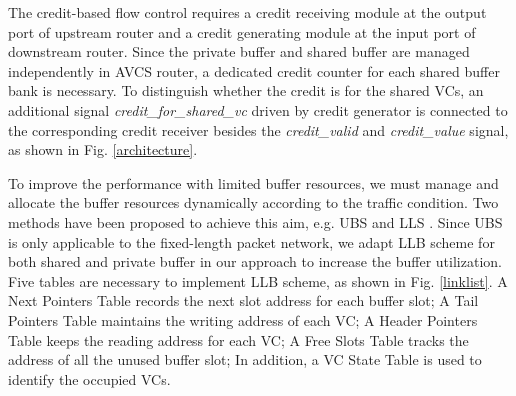 \documentclass[10pt,conference]{IEEEtran}
\begin{document}
The credit-based flow control requires a credit receiving module at the output port of upstream router and a credit generating module at the input port of downstream router. Since the private buffer and shared buffer are managed independently in AVCS router, a dedicated credit counter for each shared buffer bank is necessary. To distinguish whether the credit is for the shared VCs, an additional signal \emph{credit\_for\_shared\_vc} driven by credit generator is connected to the corresponding credit receiver besides the \emph{credit\_valid} and \emph{credit\_value} signal, as shown in Fig. \ref{architecture}.

To improve the performance with limited buffer resources, we must manage and allocate the buffer resources dynamically according to the traffic condition. Two methods have been proposed to achieve this aim, e.g. UBS \cite{NPKV06}\cite{5770788} and LLS \cite{4555894}\cite{Neishaburi:2009:RAN:1531542.1531658}. Since UBS is only applicable to the fixed-length packet network, we adapt LLB scheme for both shared and private buffer in our approach to increase the buffer utilization. Five tables are necessary to implement LLB scheme, as shown in Fig. \ref{linklist}. A Next Pointers Table records the next slot address for each buffer slot; A Tail Pointers Table maintains the writing address of each VC; A Header Pointers Table keeps the reading address for each VC; A Free Slots Table tracks the address of all the unused buffer slot; In addition, a VC State Table is used to identify the occupied VCs.

\end{document}
